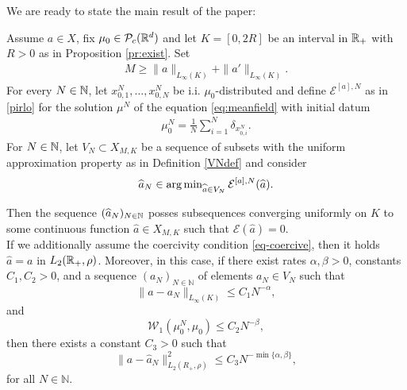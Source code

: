 We are ready to state the main result of the paper:

\begin{theorem}\label{thm} Assume $a\in X$, fix $\mu_0 \in \mathcal{P}_c(\mathbb{R}^d)$ and let  $K=[0,2R]$ be an interval in $\mathbb{R}_+$ with $R>0$ as in Proposition \ref{pr:exist}.
	Set
	\begin{align*}
	M \geq \|a\|_{L_{\infty}(K)} + \|a'\|_{L_{\infty}(K)}.
	\end{align*}
	For every $N \in \mathbb{N}$, let $x_{0,1}^N,\ldots,x_{0,N}^N$ be i.i. $\mu_0$-distributed and define  $\mathcal E^{[a],N}$ as in \eqref{pirlo} for the solution $\mu^N$ of the equation \eqref{eq:meanfield} with initial datum
	\begin{align*}
	\mu^N_0 = \frac{1}{N}\sum^N_{i = 1} \delta_{x_{0,i}^N}.
	\end{align*}
	For  $N \in \mathbb{N}$, let $V_N\subset X_{M,K}$ be a sequence of subsets with the uniform approximation property as in Definition \ref{VNdef} and consider
	\begin{align*}
		\widehat a_N\in\operatorname{arg\,min}_{\widehat a\in V_N} \mathcal E^{[a],N}(\widehat a).
	\end{align*}
	
	Then the sequence $(\widehat a_{N})_{N \in \mathbb{N}}$ posses subsequences converging uniformly on $K$ to some continuous function $\widehat a \in X_{M,K}$ such that
	$\mathcal E(\widehat a)=0$. \\
 If we additionally assume the coercivity condition \eqref{eq-coercive}, then it holds $\widehat a=a$ in $L_2(\mathbb{R}_+,\rho)$. Moreover, in this case, if there exist  rates $\alpha,\beta >0$, constants $C_1,C_2>0$, and a sequence $(a_N)_{N \in \mathbb N}$ of elements $a_N \in V_N$ such that 
\begin{equation}\label{rate1}
 \| a - a_N \|_{L_\infty(K)} \leq C_1 N^{-\alpha},
\end{equation}
and 
\begin{equation}\label{rate2}
 \mathcal W_1(\mu_0^N,\mu_0) \leq C_2 N^{-\beta},
\end{equation}
then there exists a constant $C_3>0$ such that 
\begin{equation}\label{rateapprox}
 \| a - \widehat a_N \|_{L_2(R_+,\rho)}^2 \leq C_3 N^{-\min\{ \alpha, \beta\}},
\end{equation}
for all $N \in \mathbb N$.

\end{theorem}


